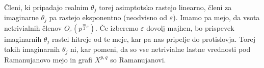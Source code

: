 Členi, ki pripadajo realnim \(\theta_j\) torej asimptotsko rastejo linearno, členi za imaginarne \(\theta_j\) pa rastejo eksponentno (neodvisno od \(\varepsilon\)). Imamo pa mejo, da vsota netrivialnih členov \(O_\varepsilon\left(p^{\frac{m}{2}\varepsilon}\right)\). Če izberemo \(\varepsilon\) dovolj majhen, bo prispevek imaginarnih \(\theta_j\) rastel hitreje od te meje, kar pa nas pripelje do protislovja. Torej takih imaginarnih \(\theta_j\) ni, kar pomeni, da so vse netrivialne lastne vrednosti pod Ramanujanovo mejo in grafi \(X^{p,q}\) so Ramanujanovi.

